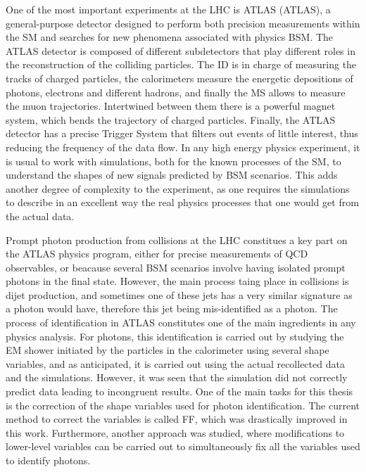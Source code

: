 One of the most important experiments at the \ac{LHC} is \ac{ATLAS} (\acl{ATLAS}), a general-purpose detector designed to perform both precision measurements within the \ac{SM} and searches for new phenomena associated with physics \ac{BSM}. The \ac{ATLAS} detector is composed of different subdetectors that play different roles in the reconstruction of the colliding particles. The \acl{ID} is in charge of measuring the tracks of charged particles, the calorimeters measure the energetic depositions of photons, electrons and different hadrons, and finally the \ac{MS} allows to measure the muon trajectories. Intertwined between them there is a powerful magnet system, which bends the trajectory of charged particles. Finally, the \ac{ATLAS} detector has a precise Trigger System that filters out events of little interest, thus reducing the frequency of the data flow. 
In any high energy physics experiment, it is usual to work with simulations, both for the known processes of the \ac{SM}, to understand the shapes of new signals predicted by \ac{BSM} scenarios. This adds another degree of complexity to the experiment, as one requires the simulations to describe in an excellent way the real physics processes that one would get from the actual data.

Prompt photon production from \pp collisions at the \ac{LHC} constitues a key part on the \ac{ATLAS} physics program, either for precise measurements of \ac{QCD} observables, or beacause several \ac{BSM} scenarios involve having isolated prompt photons in the final state. However, the main process taing place in \pp collisions is dijet production, and sometimes one of these jets has a very similar signature as a photon would have, therefore this jet being mis-identified as a photon. The process of identification in \ac{ATLAS} constitutes one of the main ingredients in any physics analysis. For photons, this identification is carried out by studying the \ac{EM} shower initiated by the particles in the calorimeter using several shape variables, and as anticipated, it is carried out using the actual recollected data and the simulations. However, it was seen that the simulation did not correctly predict data leading to incongruent results.
One of the main tasks for this thesis is the correction of the shape variables used for photon identification. The current method to correct the variables is called \ac{FF}, which was drastically improved in this work. Furthermore, another approach was studied, where modifications to lower-level variables can be carried out to simultaneously fix all the variables used to identify photons.

